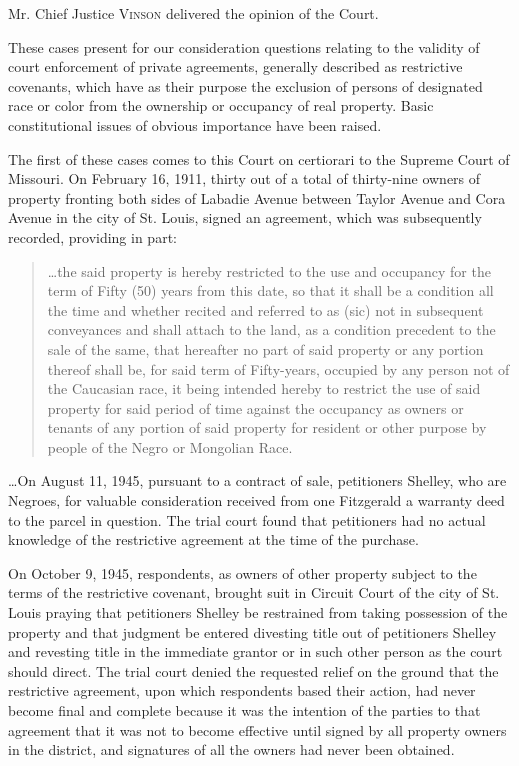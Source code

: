 
\opinion Mr. Chief Justice \textsc{Vinson} delivered the opinion of the Court.

These cases present for our consideration questions relating to the validity of
court enforcement of private agreements, generally described as restrictive
covenants, which have as their purpose the exclusion of persons of designated
race or color from the ownership or occupancy of real property. Basic
constitutional issues of obvious importance have been raised.

The first of these cases comes to this Court on certiorari to the Supreme Court
of Missouri. On February 16, 1911, thirty out of a total of thirty-nine owners
of property fronting both sides of Labadie Avenue between Taylor Avenue and Cora
Avenue in the city of St. Louis, signed an agreement, which was subsequently
recorded, providing in part:
\begin{quote}
\ldots the said property is hereby restricted to the use and occupancy for the
term of Fifty (50) years from this date, so that it shall be a condition all the
time and whether recited and referred to as (sic) not in subsequent conveyances
and shall attach to the land, as a condition precedent to the sale of the same,
that hereafter no part of said property or any portion thereof shall be, for
said term of Fifty-years, occupied by any person not of the Caucasian race, it
being intended hereby to restrict the use of said property for said period of
time against the occupancy as owners or tenants of any portion of said property
for resident or other purpose by people of the Negro or Mongolian Race.
\end{quote}

\ldots On August 11, 1945, pursuant to a contract of sale, petitioners Shelley,
who are Negroes, for valuable consideration received from one Fitzgerald a
warranty deed to the parcel in question. The trial court found that petitioners
had no actual knowledge of the restrictive agreement at the time of the
purchase.

On October 9, 1945, respondents, as owners of other property subject to the
terms of the restrictive covenant, brought suit in Circuit Court of the city of
St. Louis praying that petitioners Shelley be restrained from taking possession
of the property and that judgment be entered divesting title out of petitioners
Shelley and revesting title in the immediate grantor or in such other person as
the court should direct. The trial court denied the requested relief on the
ground that the restrictive agreement, upon which respondents based their
action, had never become final and complete because it was the intention of the
parties to that agreement that it was not to become effective until signed by
all property owners in the district, and signatures of all the owners had never
been obtained.

